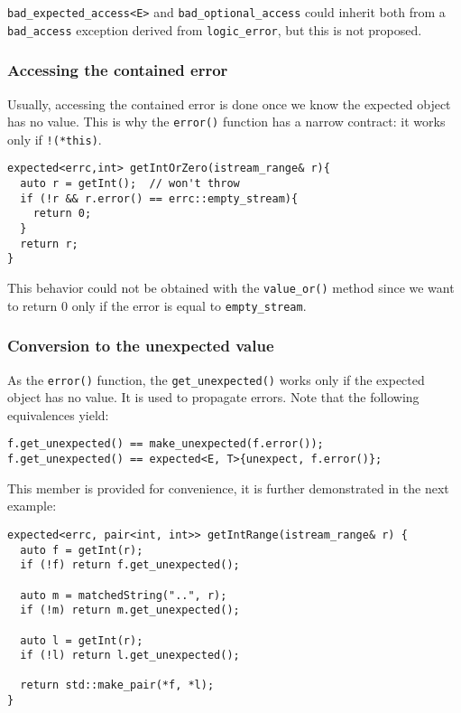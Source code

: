 \documentclass[a4paper,10pt]{article}
\newcommand{\cpp}[1]{\lstinline{#1}}
\begin{document}
\cpp{bad_expected_access<E>} and \cpp{bad_optional_access} could inherit both from a \cpp{bad_access} exception derived from \cpp{logic_error}, but this is not proposed.

\subsubsection{Accessing the contained error}

Usually, accessing the contained error is done once we know the expected object has no value. This is why the \cpp{error()} function has a narrow contract: it works only if \cpp{!(*this)}.

\begin{lstlisting}
expected<errc,int> getIntOrZero(istream_range& r){
  auto r = getInt();  // won't throw
  if (!r && r.error() == errc::empty_stream){
    return 0;
  }
  return r;
}
\end{lstlisting}

\noindent
This behavior could not be obtained with the \cpp{value_or()} method since we want to return 0 only if the error is equal to \cpp{empty_stream}.

\subsubsection{Conversion to the unexpected value}

As the \cpp{error()} function, the \cpp{get_unexpected()} works only if the expected object has no value. It is used to propagate errors. Note that the following equivalences yield:

\begin{lstlisting}
f.get_unexpected() == make_unexpected(f.error());
f.get_unexpected() == expected<E, T>{unexpect, f.error()};
\end{lstlisting}

\noindent
This member is provided for convenience, it is further demonstrated in the next example:

\begin{lstlisting}
expected<errc, pair<int, int>> getIntRange(istream_range& r) {
  auto f = getInt(r);
  if (!f) return f.get_unexpected();

  auto m = matchedString("..", r);
  if (!m) return m.get_unexpected();

  auto l = getInt(r);
  if (!l) return l.get_unexpected();

  return std::make_pair(*f, *l);
}
\end{lstlisting}
\end{document}
